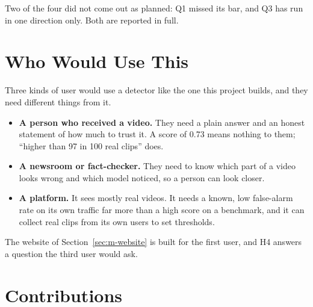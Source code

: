 Two of the four did not come out as planned: Q1 missed its bar, and Q3 has
run in one direction only. Both are reported in full.

\section{Who Would Use This}
\label{sec:users}

Three kinds of user would use a detector like the one this project builds,
and they need different things from it.

\begin{itemize}
    \item \textbf{A person who received a video.} They need a plain answer
    and an honest statement of how much to trust it. A score of 0.73 means
    nothing to them; ``higher than 97 in 100 real clips'' does.
    \item \textbf{A newsroom or fact-checker.} They need to know which part of
    a video looks wrong and which model noticed, so a person can look closer.
    \item \textbf{A platform.} It sees mostly real videos. It needs a known,
    low false-alarm rate on its own traffic far more than a high score on a
    benchmark, and it can collect real clips from its own users to set
    thresholds.
\end{itemize}

The website of Section~\ref{sec:m-website} is built for the first user, and
H4 answers a question the third user would ask.

\section{Contributions}

